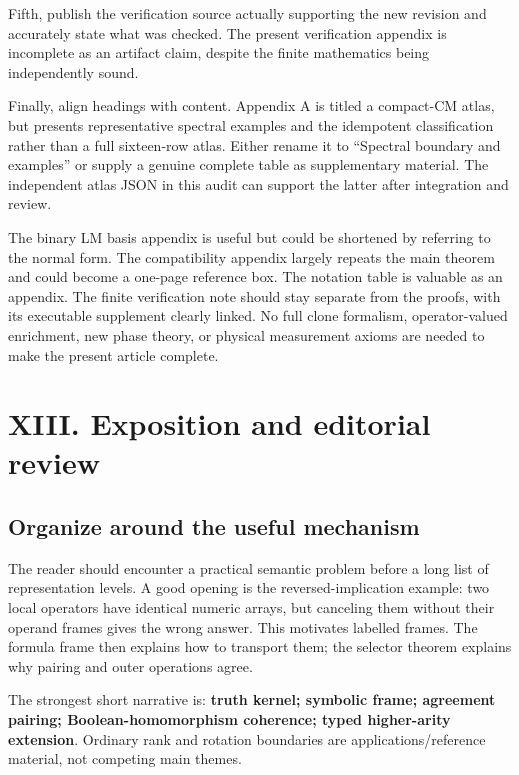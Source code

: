 \documentclass[
  10pt,
]{article}
\begin{document}
Fifth, publish the verification source actually supporting the new
revision and accurately state what was checked. The present verification
appendix is incomplete as an artifact claim, despite the finite
mathematics being independently sound.

Finally, align headings with content. Appendix A is titled a compact-CM
atlas, but presents representative spectral examples and the idempotent
classification rather than a full sixteen-row atlas. Either rename it to
``Spectral boundary and examples'' or supply a genuine complete table as
supplementary material. The independent atlas JSON in this audit can
support the latter after integration and review.

The binary LM basis appendix is useful but could be shortened by
referring to the normal form. The compatibility appendix largely repeats
the main theorem and could become a one-page reference box. The notation
table is valuable as an appendix. The finite verification note should
stay separate from the proofs, with its executable supplement clearly
linked. No full clone formalism, operator-valued enrichment, new phase
theory, or physical measurement axioms are needed to make the present
article complete.

\section{XIII. Exposition and editorial
review}\label{xiii.-exposition-and-editorial-review}

\subsection{Organize around the useful
mechanism}\label{organize-around-the-useful-mechanism}

The reader should encounter a practical semantic problem before a long
list of representation levels. A good opening is the
reversed-implication example: two local operators have identical numeric
arrays, but canceling them without their operand frames gives the wrong
answer. This motivates labelled frames. The formula frame then explains
how to transport them; the selector theorem explains why pairing and
outer operations agree.

The strongest short narrative is: \textbf{truth kernel; symbolic frame;
agreement pairing; Boolean-homomorphism coherence; typed higher-arity
extension}. Ordinary rank and rotation boundaries are
applications/reference material, not competing main themes.
\end{document}
